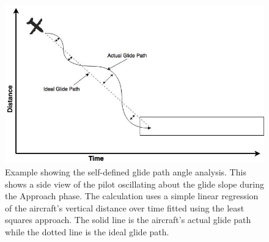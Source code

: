             
            \begin{figure}[t]
            	\centering
                \includegraphics[width=\linewidth]{img/self_defined_example.jpg}
                \caption{Example showing the self-defined glide path angle analysis.  This shows a side view of the pilot oscillating about the glide slope during the Approach phase.  The calculation uses a simple linear regression of the aircraft's vertical distance over time fitted using the least squares approach.  The solid line is the aircraft's actual glide path while the dotted line is the ideal glide path.}
                \label{fig:self_defined_example}
            \end{figure}
            
